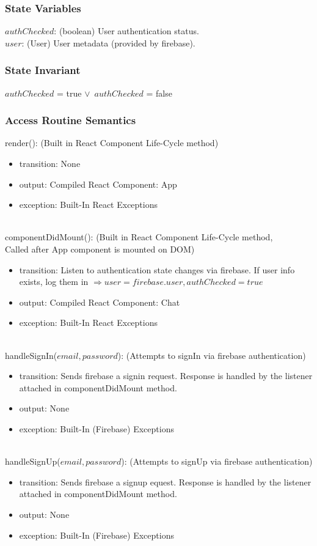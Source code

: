 \documentclass[12pt, titlepage]{article}
\begin{document}
\subsubsection* {State Variables}
$authChecked$: (boolean) User authentication status.\\
$user$: (User) User metadata (provided by firebase).
\subsubsection* {State Invariant}
{$authChecked$ = true $\vee\,\,\, authChecked$ = false}
\newpage
\subsubsection* {Access Routine Semantics}

render(): (Built in React Component Life-Cycle method)
\begin{itemize}
\item transition: None
\item output: Compiled React Component: App
\item exception: Built-In React Exceptions
\end{itemize}\\
componentDidMount(): (Built in React Component Life-Cycle method, \\Called after App component is mounted on DOM)
\begin{itemize}
\item transition: Listen to authentication state changes via firebase. If user info exists, log them in $\Rightarrow user = firebase.user, authChecked = true$
\item output: Compiled React Component: Chat 
\item exception: Built-In React Exceptions
\end{itemize}\\
handleSignIn($email, password$): (Attempts to signIn via firebase authentication)
\begin{itemize}
\item transition: Sends firebase a signin request. Response is handled by the listener attached in componentDidMount method.
\item output: None 
\item exception: Built-In (Firebase) Exceptions
\end{itemize}\\
handleSignUp($email, password$): (Attempts to signUp via firebase authentication)
\begin{itemize}
\item transition: Sends firebase a signup equest. Response is handled by the listener attached in componentDidMount method.
\item output: None 
\item exception: Built-In (Firebase) Exceptions
\end{itemize}\\
\end{document}
